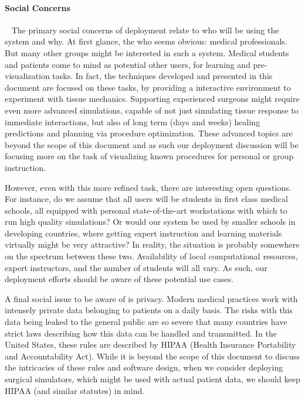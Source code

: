 \paragraph{Social Concerns}~ The primary social concerns of deployment
relate to who will be using the system and why. At first glance, the
who seems obvious: medical professionals. But many other groups might be interested
in such a system. Medical students and patients come to mind as
potential other users, for learning and pre-visualization tasks. In
fact, the techniques developed and presented in this document are
focused on these tasks, by providing a interactive environment to
experiment with tissue mechanics. Supporting experienced surgeons
might require even more advanced simulations, capable of not just
simulating tissue response to immediate interactions, but also of
long term (days and weeks) healing predictions and planning via
procedure optimization. These advanced topics are beyond the scope of
this document and as such our deployment discussion will be focusing
more on the task of visualizing known procedures for personal or group
instruction.

However, even with this more refined task, there are interesting open
questions. For instance, do we assume that all users will be students
in first class medical schools, all equipped with personal
state-of-the-art workstations with which to run high quality
simulations? Or would our system be used by smaller schools in
developing countries, where getting expert instruction and learning
materials virtually might be very attractive? In reality, the
situation is probably somewhere on the spectrum between these
two. Availability of local computational resources, expert
instructors, and the number of students will all vary. As such, our
deployment efforts should be aware of these potential use cases.

A final social issue to be aware of is privacy. Modern medical
practices work with intensely private data belonging to patients on a
daily basis. The risks with this data being leaked to the general
public are so severe that many countries have strict laws describing
how this data can be handled and transmitted. In the United States,
these rules are described by HIPAA (Health Insurance Portability and
Accountability Act). While it is beyond the scope of this document to
discuss the intricacies of these rules and software design, when we
consider deploying surgical simulators, which might be used with
actual patient data, we should keep HIPAA (and similar statutes) in mind.

